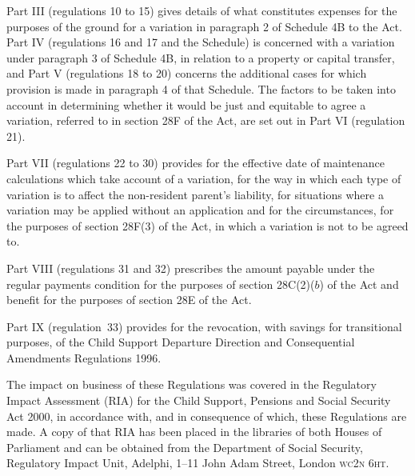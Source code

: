 \documentclass[12pt,a4paper]{article}
\begin{document}
Part III (regulations 10 to 15) gives details of what constitutes expenses for the purposes of the ground for a variation in paragraph 2 of Schedule 4B to the Act. Part IV (regulations 16 and 17 and the Schedule) is concerned with a variation under paragraph 3 of Schedule 4B, in relation to a property or capital transfer, and Part V (regulations 18 to 20) concerns the additional cases for which provision is made in paragraph 4 of that Schedule. The factors to be taken into account in determining whether it would be just and equitable to agree a variation, referred to in section 28F of the Act, are set out in Part VI (regulation 21).

Part VII (regulations 22 to 30) provides for the effective date of maintenance calculations which take account of a variation, for the way in which each type of variation is to affect the non-resident parent’s liability, for situations where a variation may be applied without an application and for the circumstances, for the purposes of section 28F(3) of the Act, in which a variation is not to be agreed to.

Part VIII (regulations 31 and 32) prescribes the amount payable under the regular payments condition for the purposes of section 28C(2)($b$)  of the Act and benefit for the purposes of section 28E of the Act.

Part IX (regulation~33) provides for the revocation, with savings for transitional purposes, of the Child Support Departure Direction and Consequential Amendments Regulations 1996.

The impact on business of these Regulations was covered in the Regulatory Impact Assessment (RIA) for the Child Support, Pensions and Social Security Act 2000, in accordance with, and in consequence of which, these Regulations are made. A copy of that RIA has been placed in the libraries of both Houses of Parliament and can be obtained from the Department of Social Security, Regulatory Impact Unit, Adelphi, 1--11 John Adam Street, London \textsc{\lowercase{WC2N 6HT}}. 
\end{document}
